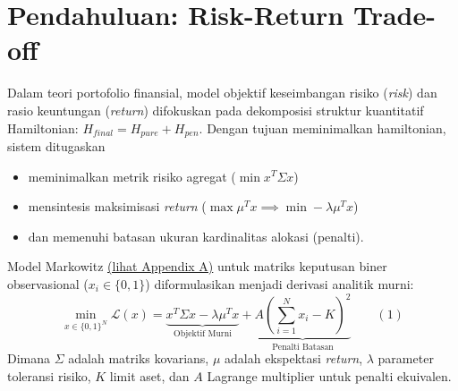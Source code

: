 \hypertarget{pendahuluan-risk-return-trade-off}{%
\section{Pendahuluan: Risk-Return Trade-off}\label{pendahuluan-risk-return-trade-off}}

Dalam teori portofolio finansial, model objektif keseimbangan risiko (\emph{risk}) dan rasio keuntungan (\emph{return}) difokuskan pada dekomposisi struktur kuantitatif Hamiltonian: \(H_{final} = H_{pure} + H_{pen}\). Dengan tujuan meminimalkan hamiltonian, sistem ditugaskan
\begin{itemize}
    \item meminimalkan metrik risiko agregat (\(\min x^T \Sigma x\))
    \item mensintesis maksimisasi \emph{return} (\(\max \mu^T x \implies \min -\lambda \mu^T x\))
    \item dan memenuhi batasan ukuran kardinalitas alokasi (penalti).
\end{itemize}
Model Markowitz \hyperref[appendix-a]{(lihat Appendix A)} untuk matriks keputusan biner observasional (\(x_i \in \{0, 1\}\)) diformulasikan menjadi derivasi analitik murni:
\[ \min_{x \in \{0,1\}^N} \mathcal{L}(x) = \underbrace{x^T \Sigma x - \lambda \mu^T x}_{\text{Objektif Murni}} + \underbrace{A \left(\sum_{i=1}^N x_i - K \right)^2}_{\text{Penalti Batasan}} \qquad (1) \]
Dimana \(\Sigma\) adalah matriks kovarians, \(\mu\) adalah ekspektasi \emph{return}, \(\lambda\) parameter toleransi risiko, \(K\) limit aset, dan \(A\) Lagrange multiplier untuk penalti ekuivalen.


